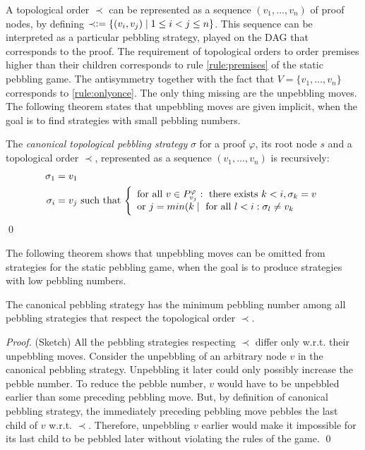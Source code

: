 A topological order $\prec$ can be represented as a sequence $(v_1,\dots,v_n)$ of proof nodes, by defining $\prec \mathrel{\mathop:}= \{(v_i,v_j) \mid 1 \leq i < j \leq n\}$. 
This sequence can be interpreted as a particular pebbling strategy, played on the DAG that corresponds to the proof.
The requirement of topological orders to order premises higher than their children corresponds to rule \ref{rule:premises} of the static pebbling game.
The antisymmetry together with the fact that $V = \{v_1,\dots,v_n\}$ corresponds to \ref{rule:onlyonce}.
The only thing missing are the unpebbling moves.
The following theorem states that unpebbling moves are given implicit, when the goal is to find strategies with small pebbling numbers.

\begin{definition}
The \emph{canonical topological pebbling strategy} $\sigma$ for a proof $\varphi$, its root node $s$ and a topological order $\prec$, represented as a sequence $(v_1,\dots,v_n)$ is recursively:
\begin{align*}
\sigma_1 &= v_1\\
\sigma_i &= v_j\text{ such that }\Bigg\{
\begin{array}{l}
	\text{for all }v \in P_{v_j}^{\varphi}:\text{ there exists }k < i, \sigma_k = v \\
	\text{or }j = min(k \mid \text{ for all }l < i: \sigma_l \neq v_k
\end{array}
\end{align*}
\qed
\end{definition}

The following theorem shows that unpebbling moves can be omitted from strategies for the static pebbling game, when the goal is to produce strategies with low pebbling numbers.

\begin{theorem}
\label{theorem:canonical}
The canonical pebbling strategy has the minimum pebbling number among all pebbling strategies that respect the topological order $\prec$.
\end{theorem}
\begin{proof} (Sketch)
All the pebbling strategies respecting $\prec$ differ only w.r.t. their unpebbling moves.
Consider the unpebbling of an arbitrary node $v$ in the canonical pebbling strategy. Unpebbling it later could only possibly increase the pebble number. To reduce the pebble number, $v$ would have to be unpebbled earlier than some preceding pebbling move. But, by definition of canonical pebbling strategy, the immediately preceding pebbling move pebbles the last child of $v$ w.r.t. $\prec$. Therefore, unpebbling $v$ earlier would make it impossible for its last child to be pebbled later without violating the rules of the game.
\qed
\end{proof}

